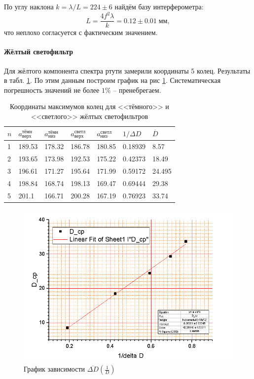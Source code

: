 \documentclass[a4paper]{article}
\begin{document}
По углу наклона $ k = \lambda / L = 224\pm 6 $ найдём базу интерферометра:
\begin{equation*}\label{key}
	L=\frac{4 f^2 \lambda}{k} = 0.12 \pm 0.01\; мм,
\end{equation*}
что неплохо согласуется с фактическим значением.

\paragraph{Жёлтый светофильтр}

Для жёлтого компонента спектра ртути замерили координаты 5 колец. Результаты в табл. \ref{tab:yellowdata}. По этим данным построим график на рис \ref{fig:screenshot4}. Систематическая погрешность значений не более $ 1 \% $ -- пренебрегаем.

\begin{table}[h]
	\centering
	\begin{tabular}{|l|l|l|l|l|l|l|}
		\hline
		$ n $ & $a_{верх}^{тёмн} $ & $a_{низ}^{тёмн}$ & $a_{верх}^{светл} $ & $a_{низ}^{светл} $ & $1/\Delta D$ & $\overline{D}$ \\ \hline
		1 & 189.53 & 178.32 & 186.78 & 180.85 & 0.18939 & 8.57   \\ \hline
		2 & 193.65 & 173.98 & 192.53 & 175.22 & 0.42373 & 18.49  \\ \hline
		3 & 196.61 & 171.27 & 195.64 & 171.99 & 0.59172 & 24.495 \\ \hline
		4 & 198.84 & 168.74 & 198.13 & 169.47 & 0.69444 & 29.38  \\ \hline
		5 & 201.1  & 166.71 & 200.28 & 167.19 & 0.76923 & 33.74  \\ \hline
	\end{tabular}
	\caption{Координаты максимумов колец для <<тёмного>> и <<светлого>> жёлтых светофильтров }
	\label{tab:yellowdata}
\end{table}

\begin{figure}[]
	\centering
	\includegraphics[width=0.8\linewidth]{Screenshot_4}
	\caption{График зависимости $\overline{\Delta D}(\frac{1}{D})$}
	\label{fig:screenshot4}
\end{figure}
\end{document}
